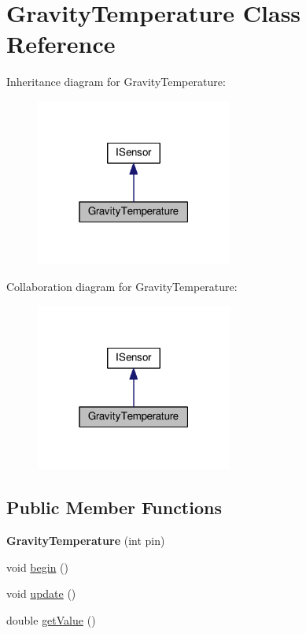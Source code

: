 \hypertarget{class_gravity_temperature}{}\section{Gravity\+Temperature Class Reference}
\label{class_gravity_temperature}


Inheritance diagram for Gravity\+Temperature\+:\nopagebreak
\begin{figure}[H]
\begin{center}
\leavevmode
\includegraphics[width=183pt]{class_gravity_temperature__inherit__graph}
\end{center}
\end{figure}


Collaboration diagram for Gravity\+Temperature\+:\nopagebreak
\begin{figure}[H]
\begin{center}
\leavevmode
\includegraphics[width=183pt]{class_gravity_temperature__coll__graph}
\end{center}
\end{figure}
\subsection*{Public Member Functions}
\begin{DoxyCompactItemize}
\item 
{\bfseries Gravity\+Temperature} (int pin)\hypertarget{class_gravity_temperature_a1156c03146096ebd11dfeb12d047b017}{}\label{class_gravity_temperature_a1156c03146096ebd11dfeb12d047b017}

\item 
void \hyperlink{class_gravity_temperature_a4b0e6bba015c69a153a85cc8221dee2f}{begin} ()
\item 
void \hyperlink{class_gravity_temperature_aa7a3463559fe46fa4471f779fb5ffdce}{update} ()
\item 
double \hyperlink{class_gravity_temperature_a7ee39e7ab5521f9dcbdea543c26c3a26}{get\+Value} ()
\end{DoxyCompactItemize}
